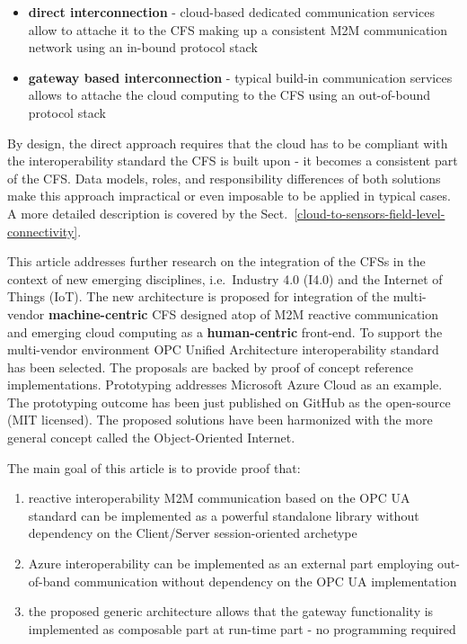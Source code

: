 \documentclass{jacsart}
\begin{document}
\begin{itemize}
      \item \textbf{direct interconnection} - cloud-based dedicated communication services allow to attache it to the CFS making up a consistent M2M communication network using an in-bound protocol stack
      \item \textbf{gateway based interconnection} - typical build-in communication services allows to attache the cloud computing to the CFS using an out-of-bound protocol stack
\end{itemize}

By design, the direct approach requires that the cloud has to be compliant with the interoperability standard the CFS is built upon - it becomes a consistent part of the CFS. Data models, roles, and responsibility differences of both solutions make this approach impractical or even imposable to be applied in typical cases. A more detailed description is covered by the Sect.~\ref*{cloud-to-sensors-field-level-connectivity}.

This article addresses further research on the integration of the CFSs in the context of new emerging disciplines, i.e.~Industry 4.0 (I4.0) and the Internet of Things (IoT). The new architecture is proposed for integration of the multi-vendor \textbf{machine-centric} CFS designed atop of M2M reactive communication and emerging cloud computing as a \textbf{human-centric} front-end. To support the multi-vendor environment OPC Unified Architecture interoperability standard has been selected. The proposals are backed by proof of concept reference implementations. Prototyping addresses Microsoft Azure Cloud as an example. The prototyping outcome has been just published on GitHub as the open-source (MIT licensed). The proposed solutions have been harmonized with the more general concept called the Object-Oriented Internet.

The main goal of this article is to provide proof that:

\begin{enumerate}
      \item  reactive interoperability M2M communication based on the OPC UA standard can be implemented as a powerful standalone library without dependency on the Client/Server session-oriented archetype
      \item Azure interoperability can be implemented as an external part employing out-of-band communication without dependency on the OPC UA implementation
      \item the proposed generic architecture allows that the gateway functionality is implemented as composable part at run-time part - no programming required
\end{enumerate}
\end{document}
